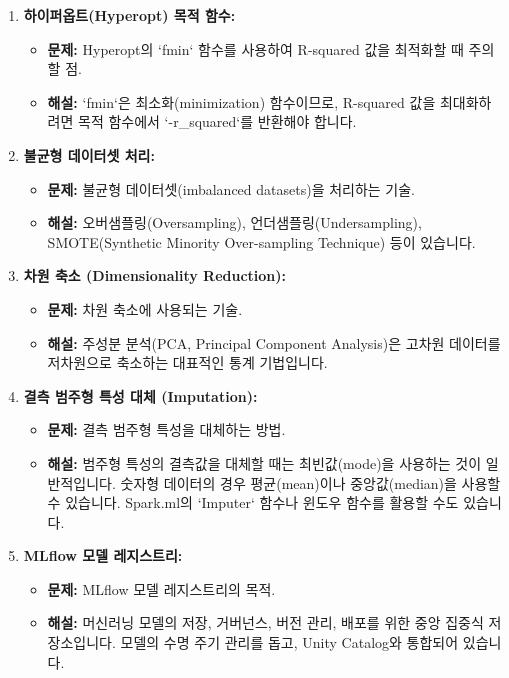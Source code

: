 \documentclass[11pt,a4paper]{article}
\begin{document}
\begin{enumerate}
    \item \textbf{하이퍼옵트(Hyperopt) 목적 함수:}
    \begin{itemize}
        \item \textbf{문제:} Hyperopt의 `fmin` 함수를 사용하여 R-squared 값을 최적화할 때 주의할 점.
        \item \textbf{해설:} `fmin`은 최소화(minimization) 함수이므로, R-squared 값을 최대화하려면 목적 함수에서 `-r_squared`를 반환해야 합니다.
    \end{itemize}

    \item \textbf{불균형 데이터셋 처리:}
    \begin{itemize}
        \item \textbf{문제:} 불균형 데이터셋(imbalanced datasets)을 처리하는 기술.
        \item \textbf{해설:} 오버샘플링(Oversampling), 언더샘플링(Undersampling), SMOTE(Synthetic Minority Over-sampling Technique) 등이 있습니다.
    \end{itemize}

    \item \textbf{차원 축소 (Dimensionality Reduction):}
    \begin{itemize}
        \item \textbf{문제:} 차원 축소에 사용되는 기술.
        \item \textbf{해설:} 주성분 분석(PCA, Principal Component Analysis)은 고차원 데이터를 저차원으로 축소하는 대표적인 통계 기법입니다.
    \end{itemize}

    \item \textbf{결측 범주형 특성 대체 (Imputation):}
    \begin{itemize}
        \item \textbf{문제:} 결측 범주형 특성을 대체하는 방법.
        \item \textbf{해설:} 범주형 특성의 결측값을 대체할 때는 최빈값(mode)을 사용하는 것이 일반적입니다. 숫자형 데이터의 경우 평균(mean)이나 중앙값(median)을 사용할 수 있습니다. Spark.ml의 `Imputer` 함수나 윈도우 함수를 활용할 수도 있습니다.
    \end{itemize}

    \item \textbf{MLflow 모델 레지스트리:}
    \begin{itemize}
        \item \textbf{문제:} MLflow 모델 레지스트리의 목적.
        \item \textbf{해설:} 머신러닝 모델의 저장, 거버넌스, 버전 관리, 배포를 위한 중앙 집중식 저장소입니다. 모델의 수명 주기 관리를 돕고, Unity Catalog와 통합되어 있습니다.
    \end{itemize}


\end{enumerate}
\end{document}
